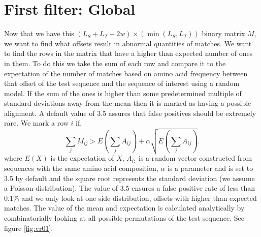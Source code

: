 \documentclass[phd,tocprelim]{cornell}
\begin{document}

\section{First filter: Global}

Now that we have this $(L_{S} + L_{T}-2w) \times (\min(L_{S},L_{T}))$ binary matrix $M$, we want to find what offsets result in abnormal quantities of matches. We want to find the rows in the matrix that have a higher than expected number of ones in them. To do this we take the sum of each row and compare it to the expectation of the number of matches based on amino acid frequency between that offset of the test sequence and the sequence of interest using a random model. If the sum of the ones is higher than some predetermined multiple of standard deviations away from the mean then it is marked as having a possible alignment. A default value of 3.5 assures that false positives should be extremely rare. We mark a row $i$ if,
\begin{equation}
    \sum_{j} M_{ij} > E\left(\sum_{j} A_{ij}\right) + \alpha \sqrt{E\left(\sum_{j} A_{ij}\right)}.
\end{equation}
where $E(X)$ is the expectation of $X$, $A_{i:}$ is a random vector constructed from sequences with the same amino acid composition, $\alpha$ is a parameter and is set to 3.5 by default and the square root represents the standard deviation (we assume a Poisson distribution). The value of 3.5 ensures a false positive rate of less than 0.1\% and we only look at one side distribution, offsets with higher than expected matches. The value of the mean and expectation is calculated analytically by combinatorially looking at all possible permutations of the test sequence. See figure \ref{fig:vr01}.
\end{document}
